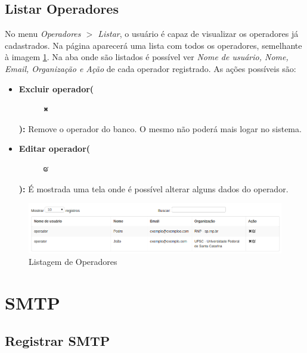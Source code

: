 \subsection{Listar Operadores}

No menu \textit{Operadores $>$ Listar}, o usuário é capaz de visualizar os operadores já cadastrados.
Na página aparecerá uma lista com todos os operadores, semelhante à imagem \ref{fig:listarop}.
Na aba onde são listados é possível ver \textit{Nome de usuário, Nome, Email, Organização e Ação} de cada operador registrado. As ações possíveis são:

\begin{itemize}

	\item \textbf{Excluir operador(}\begin{figure} \includegraphics[height=10]{images/iconedelete2} \end{figure} \textbf{):} Remove o operador do banco. O mesmo não poderá mais logar no sistema.
	\item \textbf{Editar operador(}\begin{figure} \includegraphics[height=10]{images/iconeeditar} \end{figure} \textbf{):} É mostrada uma tela onde é possível alterar alguns dados do operador.
	
\end{itemize}

\begin{figure}[ht]
     \centering
     \includegraphics[scale=0.5]{images/listarop.png}
     \caption{Listagem de Operadores}
     \label{fig:listarop}
\end{figure}

\section{SMTP}

\subsection{Registrar SMTP}

